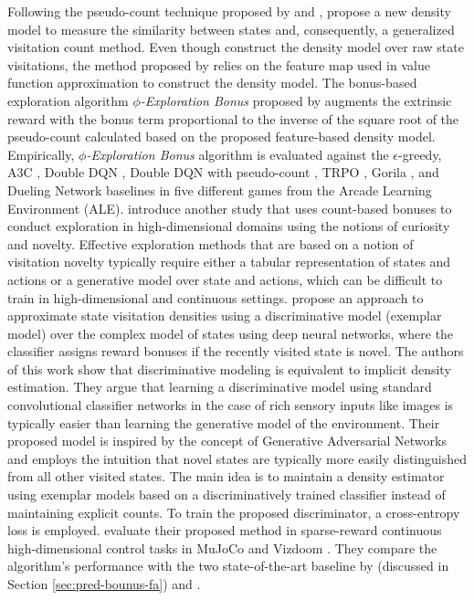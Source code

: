 Following the pseudo-count technique proposed by  and ,  propose a new density model to measure the similarity between states and, consequently, a generalized visitation count method. Even though  construct the density model over raw state visitations, the method proposed by  relies on the feature map used in value function approximation to construct the density model. The bonus-based exploration algorithm $\phi$\textit{-Exploration Bonus} proposed by  augments the extrinsic reward with the bonus term proportional to the inverse of the square root of the pseudo-count calculated based on the proposed feature-based density model. Empirically, $\phi$\textit{-Exploration Bonus} algorithm is evaluated against the $\epsilon$-greedy, A3C , Double DQN , Double DQN with pseudo-count , TRPO , Gorila , and Dueling Network  baselines in five different games from the Arcade Learning Environment (ALE).
 introduce another study that uses count-based bonuses to conduct exploration in high-dimensional domains using the notions of curiosity and novelty. Effective exploration methods that are based on a notion of visitation novelty typically require either a tabular representation of states and actions or a generative model over state and actions, which can be difficult to train in high-dimensional and continuous settings.  propose an approach to approximate state visitation densities using a discriminative model (exemplar model) over the complex model of states using deep neural networks, where the classifier assigns reward bonuses if the recently visited state is novel. The authors of this work show that discriminative modeling is equivalent to implicit density estimation. They argue that learning a discriminative model using standard convolutional classifier networks in the case of rich sensory inputs like images is typically easier than learning the generative model of the environment. Their proposed model is inspired by the concept of Generative Adversarial Networks  and employs the intuition that novel states are typically more easily distinguished from all other visited states. The main idea is to maintain a density estimator using exemplar models based on a discriminatively trained classifier instead of maintaining explicit counts. To train the proposed discriminator, a cross-entropy loss is employed.  evaluate their proposed method in sparse-reward continuous high-dimensional control tasks in MuJoCo  and Vizdoom . They compare the algorithm's performance with the two state-of-the-art baseline by  (discussed in Section \ref{sec:pred-bounus-fa}) and .
